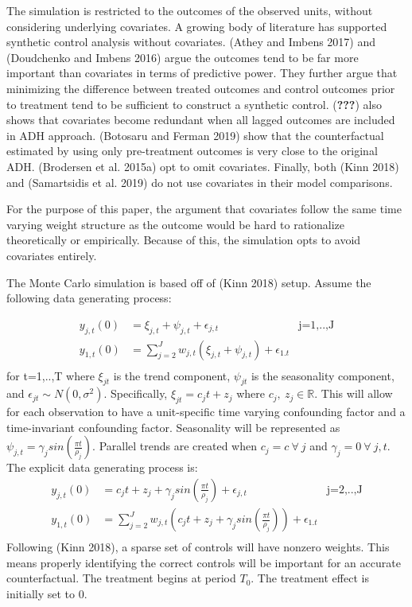 \documentclass[
]{article}
\begin{document}
The simulation is restricted to the outcomes of the observed units,
without considering underlying covariates. A growing body of literature
has supported synthetic control analysis without covariates. (Athey and
Imbens 2017) and (Doudchenko and Imbens 2016) argue the outcomes tend to
be far more important than covariates in terms of predictive power. They
further argue that minimizing the difference between treated outcomes
and control outcomes prior to treatment tend to be sufficient to
construct a synthetic control. ({\textbf{???}}) also shows that
covariates become redundant when all lagged outcomes are included in ADH
approach. (Botosaru and Ferman 2019) show that the counterfactual
estimated by using only pre-treatment outcomes is very close to the
original ADH. (Brodersen et al. 2015a) opt to omit covariates. Finally,
both (Kinn 2018) and (Samartsidis et al. 2019) do not use covariates in
their model comparisons.

For the purpose of this paper, the argument that covariates follow the
same time varying weight structure as the outcome would be hard to
rationalize theoretically or empirically. Because of this, the
simulation opts to avoid covariates entirely.

The Monte Carlo simulation is based off of (Kinn 2018) setup. Assume the
following data generating process:

\[
\begin{aligned}
y_{j,t}(0)&=\xi_{j,t} +\psi_{j,t}+\epsilon_{j,t} & \text{j=1,..,J}\\
y_{1,t}(0)&=\sum_{j=2}^J w_{j,t}(\xi_{j,t}+\psi_{j,t})+\epsilon_{1.t}\\
\end{aligned}
\] for t=1,..,T where \(\xi_{jt}\) is the trend component, \(\psi_{jt}\)
is the seasonality component, and \(\epsilon_{jt} \sim N(0,\sigma^2)\).
Specifically, \(\xi_{jt}=c_j t+z_j\) where \(c_j,\ z_j \in \mathbb{R}\).
This will allow for each observation to have a unit-specific time
varying confounding factor and a time-invariant confounding factor.
Seasonality will be represented as
\(\psi_{j,t}=\gamma_j sin\left(\frac{\pi t}{\rho_j}\right)\). Parallel
trends are created when \(c_j=c\ \forall\ j\) and
\(\gamma_{j}=0\ \forall\ {j,t}\). The explicit data generating process
is: \[
\begin{aligned}
y_{j,t}(0)&=c_j t+z_j +\gamma_j sin\left(\frac{\pi t}{\rho_j}\right)+\epsilon_{j,t} & \text{j=2,..,J}\\
y_{1,t}(0)&=\sum_{j=2}^J w_{j,t}\left( c_j t+z_j +\gamma_j sin\left(\frac{\pi t}{\rho_j}\right) \right)+\epsilon_{1.t}\\
\end{aligned}
\] Following (Kinn 2018), a sparse set of controls will have nonzero
weights. This means properly identifying the correct controls will be
important for an accurate counterfactual. The treatment begins at period
\(T_0\). The treatment effect is initially set to 0.
\end{document}
